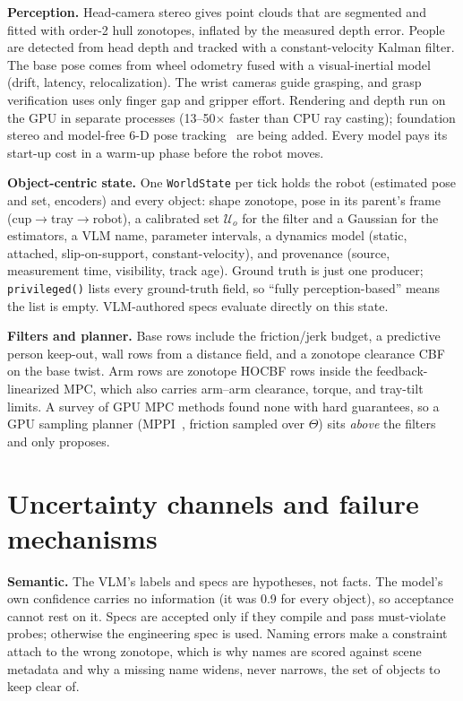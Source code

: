 \documentclass[10pt,twocolumn,letterpaper]{article}
\begin{document}
\textbf{Perception.} Head-camera stereo gives point clouds that are segmented and fitted with order-2 hull zonotopes, inflated by the measured
depth error. People are detected from head depth and tracked with a constant-velocity Kalman filter. The base pose comes from wheel odometry
fused with a visual-inertial model (drift, latency, relocalization). The wrist cameras guide grasping, and grasp verification uses only
finger gap and gripper effort. Rendering and depth run on the GPU in separate processes (13--50$\times$ faster than CPU ray casting);
foundation stereo and model-free 6-D pose tracking~\cite{fstereo,fpose} are being added. Every model pays its start-up cost in a warm-up
phase before the robot moves.

\textbf{Object-centric state.} One \texttt{WorldState} per tick holds the robot (estimated pose and set, encoders) and every object:
shape zonotope, pose in its parent's frame (cup$\to$tray$\to$robot), a calibrated set $\mathcal{U}_o$ for the filter and a Gaussian for the
estimators, a VLM name, parameter intervals, a dynamics model (static, attached, slip-on-support, constant-velocity), and provenance
(source, measurement time, visibility, track age). Ground truth is just one producer; \texttt{privileged()} lists every ground-truth field,
so ``fully perception-based'' means the list is empty. VLM-authored specs evaluate directly on this state.

\textbf{Filters and planner.} Base rows include the friction/jerk budget, a predictive person keep-out, wall rows from a distance field,
and a zonotope clearance CBF on the base twist. Arm rows are zonotope HOCBF rows inside the feedback-linearized MPC, which also carries
arm--arm clearance, torque, and tray-tilt limits. A survey of GPU MPC methods found none with hard guarantees, so a GPU sampling planner
(MPPI~\cite{mppi}, friction sampled over $\Theta$) sits \emph{above} the filters and only proposes.

\section{Uncertainty channels and failure mechanisms}\label{sec:uq}

\textbf{Semantic.} The VLM's labels and specs are hypotheses, not facts. The model's own confidence carries no information (it was 0.9 for
every object), so acceptance cannot rest on it. Specs are accepted only if they compile and pass must-violate probes; otherwise the
engineering spec is used. Naming errors make a constraint attach to the wrong zonotope, which is why names are scored against scene metadata
and why a missing name widens, never narrows, the set of objects to keep clear of.
\end{document}
